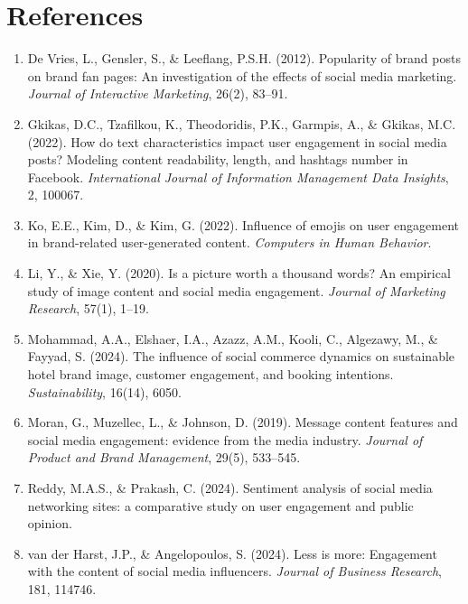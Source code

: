 \documentclass[12pt,a4paper]{article}
\begin{document}
\section*{References}

\begin{enumerate}
    \item De Vries, L., Gensler, S., \& Leeflang, P.S.H. (2012). Popularity of brand posts on brand fan pages: An investigation of the effects of social media marketing. \textit{Journal of Interactive Marketing}, 26(2), 83--91.
    \item Gkikas, D.C., Tzafilkou, K., Theodoridis, P.K., Garmpis, A., \& Gkikas, M.C. (2022). How do text characteristics impact user engagement in social media posts? Modeling content readability, length, and hashtags number in Facebook. \textit{International Journal of Information Management Data Insights}, 2, 100067.
    \item Ko, E.E., Kim, D., \& Kim, G. (2022). Influence of emojis on user engagement in brand-related user-generated content. \textit{Computers in Human Behavior}.
    \item Li, Y., \& Xie, Y. (2020). Is a picture worth a thousand words? An empirical study of image content and social media engagement. \textit{Journal of Marketing Research}, 57(1), 1--19.
    \item Mohammad, A.A., Elshaer, I.A., Azazz, A.M., Kooli, C., Algezawy, M., \& Fayyad, S. (2024). The influence of social commerce dynamics on sustainable hotel brand image, customer engagement, and booking intentions. \textit{Sustainability}, 16(14), 6050.
    \item Moran, G., Muzellec, L., \& Johnson, D. (2019). Message content features and social media engagement: evidence from the media industry. \textit{Journal of Product and Brand Management}, 29(5), 533--545.
    \item Reddy, M.A.S., \& Prakash, C. (2024). Sentiment analysis of social media networking sites: a comparative study on user engagement and public opinion.
    \item van der Harst, J.P., \& Angelopoulos, S. (2024). Less is more: Engagement with the content of social media influencers. \textit{Journal of Business Research}, 181, 114746.
\end{enumerate}
\end{document}
